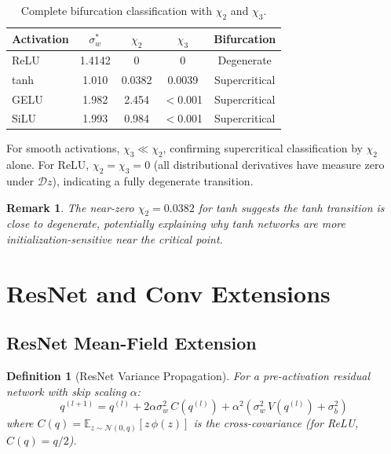 \documentclass[10pt]{article}
\newcommand{\EE}{\mathbb{E}}
\newtheorem{definition}[theorem]{Definition}
\newtheorem{remark}[theorem]{Remark}
\begin{document}
\begin{table}[h]
\centering
\caption{Complete bifurcation classification with $\chi_2$ and $\chi_3$.}
\label{tab:chi3}
\small
\begin{tabular}{@{}lcccc@{}}
\toprule
\textbf{Activation} & $\sigma_w^*$ & $\chi_2$ & $\chi_3$ & \textbf{Bifurcation} \\
\midrule
ReLU  & 1.4142 & 0        & 0       & Degenerate \\
tanh  & 1.010  & 0.0382   & 0.0039  & Supercritical \\
GELU  & 1.982  & 2.454    & $<$0.001 & Supercritical \\
SiLU  & 1.993  & 0.984    & $<$0.001 & Supercritical \\
\bottomrule
\end{tabular}
\end{table}

For smooth activations, $\chi_3 \ll \chi_2$, confirming supercritical classification by $\chi_2$ alone.
For ReLU, $\chi_2 = \chi_3 = 0$ (all distributional derivatives have measure zero under $\mathcal{D}z$), indicating a fully degenerate transition.

\begin{remark}
The near-zero $\chi_2 = 0.0382$ for tanh suggests the tanh transition is close to degenerate, potentially explaining why tanh networks are more initialization-sensitive near the critical point.
\end{remark}
\section{ResNet and Conv Extensions}
\label{app:resnet}

\subsection{ResNet Mean-Field Extension}

\begin{definition}[ResNet Variance Propagation]
For a pre-activation residual network with skip scaling $\alpha$:
\begin{equation}
    q^{(l+1)} = q^{(l)} + 2\alpha\sigma_w^2\, C(q^{(l)}) + \alpha^2(\sigma_w^2\, V(q^{(l)}) + \sigma_b^2)
    \label{eq:resnet-variance}
\end{equation}
where $C(q) = \EE_{z\sim\mathcal{N}(0,q)}[z\,\phi(z)]$ is the cross-covariance (for ReLU, $C(q) = q/2$).
\end{definition}
\end{document}
